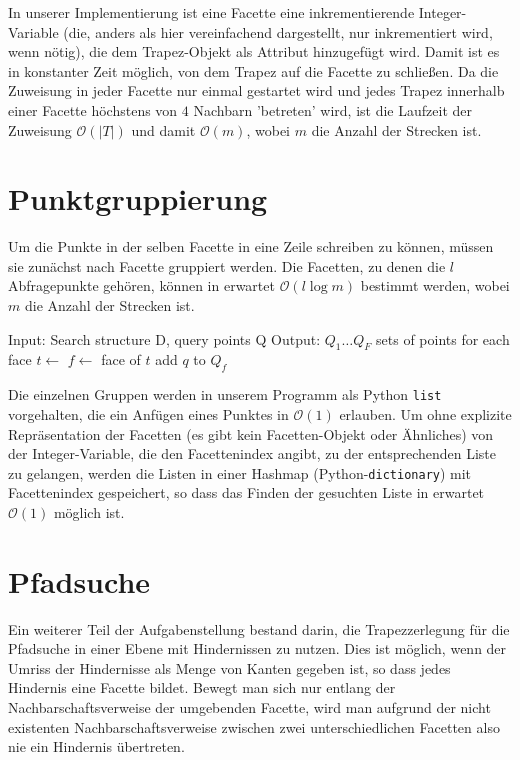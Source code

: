 \documentclass[11pt, a4paper]{article}
\newcommand{\abs}[1]{\left\lvert#1\right\rvert}
\begin{document}
In unserer Implementierung ist eine Facette eine inkrementierende Integer-Variable (die, anders als hier vereinfachend dargestellt, nur inkrementiert wird, wenn nötig), die dem Trapez-Objekt als Attribut hinzugefügt wird. Damit ist es in konstanter Zeit möglich, von dem Trapez auf die Facette zu schließen. Da die Zuweisung in jeder Facette nur einmal gestartet wird und jedes Trapez innerhalb einer Facette höchstens von $4$ Nachbarn 'betreten' wird, ist die Laufzeit der Zuweisung $\mathcal{O}(\abs{T})$ und damit $\mathcal{O}(m)$, wobei $m$ die Anzahl der Strecken ist.

\section{Punktgruppierung}
Um die Punkte in der selben Facette in eine Zeile schreiben zu können, müssen sie zunächst nach Facette gruppiert werden. Die Facetten, zu denen die $l$ Abfragepunkte gehören, können in erwartet $\mathcal{O}(l \log m)$ bestimmt werden, wobei $m$ die Anzahl der Strecken ist.

\begin{algorithmic}[1]
\State Input: Search structure D, query points Q
\State Output: $Q_1 \dots Q_F$ sets of points for each face
		\State $t \gets$ 
		\State $f \gets$ face of $t$
		\State add $q$ to $Q_f$
	\EndFor
\EndFunction
\end{algorithmic}

Die einzelnen Gruppen werden in unserem Programm als Python \texttt{list} vorgehalten, die ein Anfügen eines Punktes in $\mathcal{O}(1)$ erlauben. Um ohne explizite Repräsentation der Facetten (es gibt kein Facetten-Objekt oder Ähnliches) von der Integer-Variable, die den Facettenindex angibt, zu der entsprechenden Liste zu gelangen, werden die Listen in einer Hashmap (Python-\texttt{dictionary}) mit Facettenindex gespeichert, so dass das Finden der gesuchten Liste in erwartet $\mathcal{O}(1)$ möglich ist.

\section{Pfadsuche}
Ein weiterer Teil der Aufgabenstellung bestand darin, die Trapezzerlegung für die Pfadsuche in einer Ebene mit Hindernissen zu nutzen. Dies ist möglich, wenn der Umriss der Hindernisse als Menge von Kanten gegeben ist, so dass jedes Hindernis eine Facette bildet. Bewegt man sich nur entlang der Nachbarschaftsverweise der umgebenden Facette, wird man aufgrund der nicht existenten Nachbarschaftsverweise zwischen zwei unterschiedlichen Facetten also nie ein Hindernis übertreten.
\end{document}
